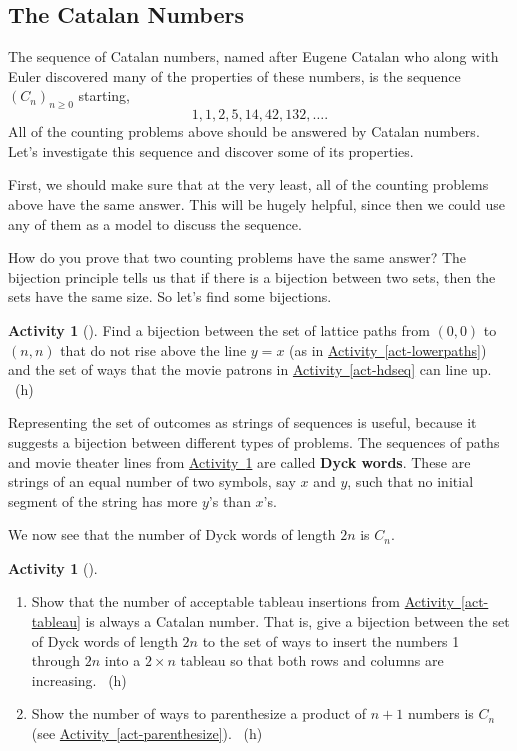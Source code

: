 \documentclass[10pt,]{book}
\newcommand{\terminology}[1]{\textbf{#1}}
\theoremstyle{plain}
\theoremstyle{definition}
\theoremstyle{definition}
\theoremstyle{definition}
\newtheorem{activity}[project]{Activity}
\numberwithin{equation}{chapter}
\begin{document}
\subsection[{The Catalan Numbers}]{The Catalan Numbers}\label{subsec-catalanseq}
\hypertarget{p-1005}{}%
The sequence of Catalan numbers, named after Eugene Catalan who along with Euler discovered many of the properties of these numbers, is the sequence \((C_n)_{n \ge 0}\) starting,%
\begin{equation*}
1, 1, 2, 5, 14, 42, 132, \ldots\text{.}
\end{equation*}
All of the counting problems above should be answered by Catalan numbers.  Let's investigate this sequence and discover some of its properties.%
\par
\hypertarget{p-1006}{}%
First, we should make sure that at the very least, all of the counting problems above have the same answer.  This will be hugely helpful, since then we could use any of them as a model to discuss the sequence.%
\par
\hypertarget{p-1007}{}%
How do you prove that two counting problems have the same answer?  The bijection principle tells us that if there is a bijection between two sets, then the sets have the same size.  So let's find some bijections.%
\begin{activity}[]\label{act-pathshdseq}
\hypertarget{p-1008}{}%
Find a bijection between the set of lattice paths from \((0,0)\) to \((n,n)\) that do not rise above the line \(y = x\) (as in \hyperref[act-lowerpaths]{Activity~\ref{act-lowerpaths}}) and the set of ways that the movie patrons in \hyperref[act-hdseq]{Activity~\ref{act-hdseq}} can line up.%
~{\tiny (h)}\end{activity}
\hypertarget{p-1010}{}%
Representing the set of outcomes as strings of sequences is useful, because it suggests a bijection between different types of problems.  The sequences of paths and movie theater lines from \hyperref[act-pathshdseq]{Activity~\ref{act-pathshdseq}} are called \terminology{Dyck words}.  These are strings of an equal number of two symbols, say \(x\) and \(y\), such that no initial segment of the string has more \(y\)'s than \(x\)'s.%
\par
\hypertarget{p-1011}{}%
We now see that the number of Dyck words of length \(2n\) is \(C_n\).%
\begin{activity}[]\label{activity-172}
\leavevmode%
\begin{enumerate}[font=\bfseries,label=(\alph*),ref=\alph*]
\item\label{task-187} \hypertarget{p-1012}{}%
Show that the number of acceptable tableau insertions from \hyperref[act-tableau]{Activity~\ref{act-tableau}} is always a Catalan number.  That is, give a bijection between the set of Dyck words of length \(2n\) to the set of ways to insert the numbers 1 through \(2n\) into a \(2\times n\) tableau so that both rows and columns are increasing.%
~{\tiny (h)}\item\label{task-188} \hypertarget{p-1014}{}%
Show the number of ways to parenthesize a product of \(n+1\) numbers is \(C_n\) (see \hyperref[act-parenthesize]{Activity~\ref{act-parenthesize}}).%
~{\tiny (h)}\end{enumerate}
\end{activity}
\end{document}
